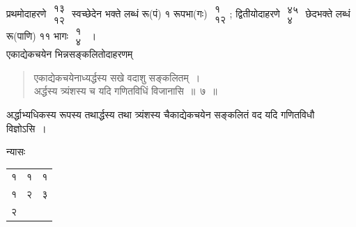 \documentclass[10pt, openany]{book}
\begin{document}
{प्रथमोदाहरणे $\begin{matrix}

\mbox{{१३}}\\

\mbox{{१२}}

\end{matrix}$ स्वच्छेदेन भक्ते लब्धं रू(पं) १ रूपभा(गः)
$\begin{matrix}

\mbox{{१}}\\

\mbox{{१२}}

\end{matrix}$; द्वितीयोदाहरणे}
$\begin{matrix}

\mbox{{४५}}\\

\mbox{{४}}

\end{matrix}$ छेदभक्ते लब्धं रू(पाणि) ११ भागः $\begin{matrix}

\mbox{{१}}\\

\mbox{{४}}

\end{matrix}$~। \\

{एकाद्येकचयेन भिन्नसङ्कलितोदाहरणम्\textemdash}

\begin{quote}

{\eg एकाद्येकचयेनाध्यर्द्धस्य सखे वदाशु सङ्कलितम्~। \\
 अर्द्धस्य त्र्यंशस्य च यदि गणितविधिं विजानासि~॥~७~॥}\end{quote}  

{अर्द्धाभ्यधिकस्य रूपस्य तथार्द्धस्य तथा त्र्यंशस्य चैकाद्येकचयेन
सङ्कलितं वद यदि गणितविधौ विज्ञोऽसि~।}
\vspace{2mm}

न्यासः\textendash \, \begin{tabular} {ccc}
१ & १& १\\
१ & २ & ३\\
२ & &
\end{tabular}
\end{document}
